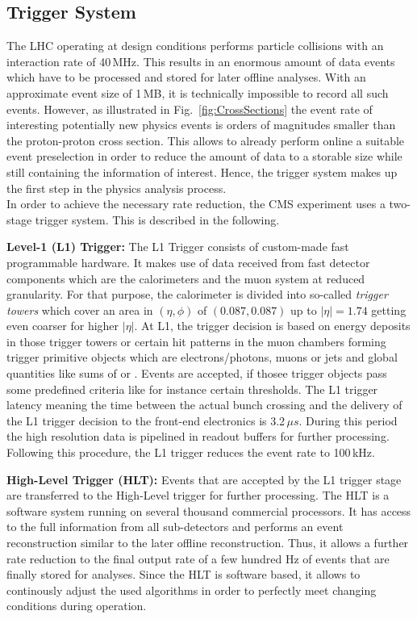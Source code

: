 \subsection{Trigger System}
\label{subsec:cms_trigger}
The LHC operating at design conditions performs particle collisions with an interaction rate of 40\,MHz. This results in an enormous amount of data events which have to be processed and stored for later offline analyses. With an approximate event size of 1\,MB, it is technically impossible to record all such events. However, as illustrated in Fig.~\ref{fig:CrossSections} the event rate of interesting potentially new physics events is orders of magnitudes smaller than the proton-proton cross section. This allows to already perform online a suitable event preselection in order to reduce the amount of data to a storable size while still containing the information of interest. Hence, the trigger system makes up the first step in the physics analysis process.\\
In order to achieve the necessary rate reduction, the CMS experiment uses a two-stage trigger system. This is described in the following.
\begin{description}
\item \textbf{Level-1 (L1) Trigger:} The L1 Trigger consists of custom-made fast programmable hardware. It makes use of data received from fast detector components which are the calorimeters and the muon system at reduced granularity. For that purpose, the calorimeter is divided into so-called \textit{trigger towers} which cover an area in $(\eta, \phi)$ of $(0.087, 0.087)$ up to $|\eta| = 1.74$ getting even coarser for higher $|\eta|$. At L1, the trigger decision is based on energy deposits in those trigger towers or certain hit patterns in the muon chambers forming trigger primitive objects which are electrons/photons, muons or jets and global quantities like sums of \et or \met. Events are accepted, if thosee trigger objects pass some predefined criteria like for instance certain \pt thresholds. The L1 trigger latency meaning the time between the actual bunch crossing and the delivery of the L1 trigger decision to the front-end electronics is 3.2\,$\mu s$. During this period the high resolution data is pipelined in readout buffers for further processing. Following this procedure, the L1 trigger reduces the event rate to 100\,kHz.
\item \textbf{High-Level Trigger (HLT):} Events that are accepted by the L1 trigger stage are transferred to the High-Level trigger for further processing. The HLT is a software system running on several thousand commercial processors. It has access to the full information from all sub-detectors and performs an event reconstruction similar to the later offline reconstruction. Thus, it allows a further rate reduction to the final output rate of a few hundred Hz of events that are finally stored for analyses. Since the HLT is software based, it allows to continously adjust the used algorithms in order to perfectly meet changing conditions during operation.
\end{description}
